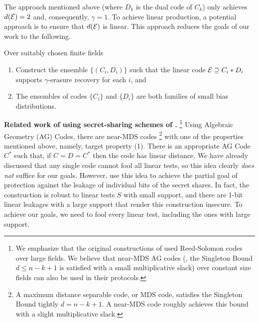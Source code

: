 
The approach mentioned above (where $D_k$ is the dual code of $C_k$) only achieves $d({\mathcal E})=2$ and, consequently, $\gamma=1$. 
To achieve linear production, a potential approach is to ensure that $d({\mathcal E})$ is linear.
%
This approach reduces the goals of our work to the following. 
\begin{boxedalgo}
	Over suitably chosen finite fields
	\begin{enumerate}
		\item Construct the ensemble $\{(C_i,D_i)\}$ such that the linear code ${\mathcal E}\supseteq C_i*D_i$ supports $\gamma$-erasure recovery for each $i$, and 
		\item The ensembles of codes $\{C_i\}$ and $\{D_i\}$ are both families of small bias distributions. 
	\end{enumerate}
\end{boxedalgo} 

\noindent\textbf{Related work of \cite{TCC:MeiPrzWul07,ICALP:PrzWul08} using secret-sharing schemes of \cite{C:CheCra06}.}%
\footnote{
	We emphasize that the original constructions of \cite{TCC:MeiPrzWul07,ICALP:PrzWul08} used Reed-Solomon codes over large fields. 
	We believe that near-MDS AG codes (\ie, the Singleton Bound $d\leq n-k+1$ is satisfied with a small multiplicative slack) over constant size fields can also be used in their protocols.  
} 
Using Algebraic Geometry (AG) Codes, there are near-MDS codes%
\footnote{
	A maximum distance separable code, or MDS code, satisfies the Singleton Bound tightly $d= n-k+1$. 
	A near-MDS code roughly achieves this bound with a slight multiplicative slack. 
}
with one of the properties mentioned above, namely, target property (1). 
There is an appropriate AG Code $C^*$ such that, if $C=D=C^*$ then the code \cE has linear distance. 
We have already discussed that any single code cannot fool all linear tests, so this idea clearly {\em does not} suffice for our goals. 
However, \cite{TCC:MeiPrzWul07,ICALP:PrzWul08} use this idea to achieve the partial goal of protection against the leakage of individual bits of the secret shares. 
In fact, the construction is robust to linear tests $S$ with small support, and there are 1-bit linear leakages with a large support that render this construction insecure. 
To achieve our goals, {we need to fool every linear test}, including the ones with large support.  %
\\

